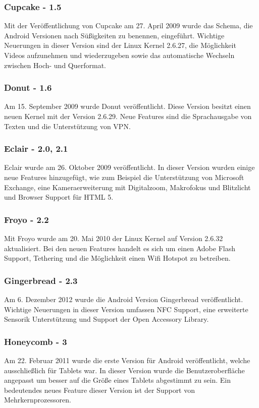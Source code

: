 \subsubsection{Cupcake - 1.5}
Mit der Veröffentlichung von Cupcake am 27. April 2009 wurde das Schema, die Android Versionen nach Süßigkeiten zu benennen, eingeführt. Wichtige Neuerungen in dieser Version sind der Linux Kernel 2.6.27, die Möglichkeit Videos aufzunehmen und wiederzugeben sowie das automatische Wechseln zwischen Hoch- und Querformat.\cite{10}

\subsubsection{Donut - 1.6}
Am 15. September 2009 wurde Donut veröffentlicht. Diese Version besitzt einen neuen Kernel mit der Version 2.6.29. Neue Features sind die Sprachausgabe von Texten und die Unterstützung von VPN.\cite{11}

\subsubsection{Eclair - 2.0, 2.1}
Eclair wurde am 26. Oktober 2009 veröffentlicht. In dieser Version wurden einige neue Features hinzugefügt, wie zum Beispiel die Unterstützung von Microsoft Exchange, eine Kameraerweiterung mit Digitalzoom, Makrofokus und Blitzlicht und Browser Support für HTML 5.\cite{12}

\subsubsection{Froyo - 2.2}
Mit Froyo wurde am 20. Mai 2010 der Linux Kernel auf Version 2.6.32 aktualisiert. Bei den neuen Features handelt es sich um einen Adobe Flash Support, Tethering und die Möglichkeit einen Wifi Hotspot zu betreiben.\cite{13}

\subsubsection{Gingerbread - 2.3}
Am 6. Dezember 2012 wurde die Android Version Gingerbread veröffentlicht. Wichtige Neuerungen in dieser Version umfassen NFC Support, eine erweiterte Sensorik Unterstützung und Support der Open Accessory Library.\cite{14}

\subsubsection{Honeycomb - 3}
Am 22. Februar 2011 wurde die erste Version für Android veröffentlicht, welche ausschließlich für Tablets war. In dieser Version wurde die Benutzeroberfläche angepasst um besser auf die Größe eines Tablets abgestimmt zu sein. Ein bedeutendes neues Feature dieser Version ist der Support von Mehrkernprozessoren.\cite{15}

